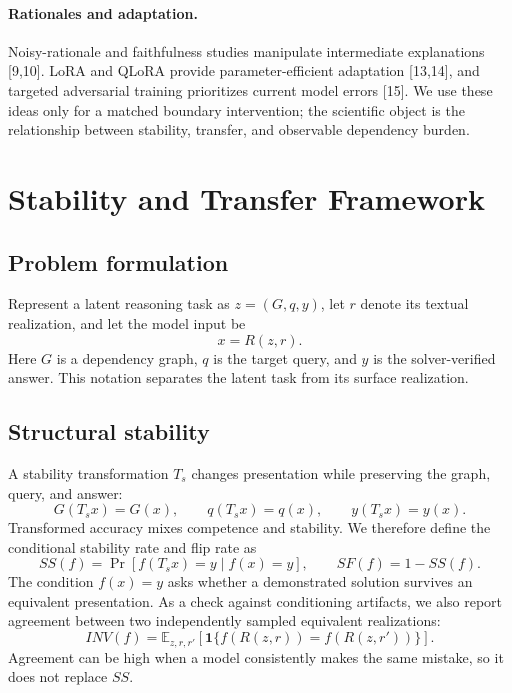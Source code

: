 \documentclass[11pt,a4paper]{article}
\theoremstyle{plain}
\begin{document}
\paragraph{Rationales and adaptation.}
Noisy-rationale and faithfulness studies manipulate intermediate explanations
[9,10]. LoRA and QLoRA provide parameter-efficient adaptation [13,14], and
targeted adversarial training prioritizes current model errors [15]. We use
these ideas only for a matched boundary intervention; the scientific object is
the relationship between stability, transfer, and observable dependency burden.

\section{Stability and Transfer Framework}

\subsection{Problem formulation}

Represent a latent reasoning task as $z=(G,q,y)$, let $r$ denote its textual
realization, and let the model input be
\begin{equation}
x=R(z,r).
\end{equation}
Here $G$ is a dependency graph, $q$ is the target query, and $y$ is the
solver-verified answer. This notation separates the latent task from its
surface realization.

\subsection{Structural stability}

A stability transformation $T_s$ changes presentation while preserving the
graph, query, and answer:
\begin{equation}
G(T_sx)=G(x), \qquad q(T_sx)=q(x), \qquad y(T_sx)=y(x).
\end{equation}
Transformed accuracy mixes competence and stability. We therefore define the
conditional stability rate and flip rate as
\begin{equation}
SS(f)=\Pr[f(T_sx)=y\mid f(x)=y],
\qquad SF(f)=1-SS(f).
\end{equation}
The condition $f(x)=y$ asks whether a demonstrated solution survives an
equivalent presentation.
As a check against conditioning artifacts, we also report agreement between
two independently sampled equivalent realizations:
\begin{equation}
INV(f)=\mathbb E_{z,r,r'}\left[
\mathbf 1\{f(R(z,r))=f(R(z,r'))\}\right].
\end{equation}
Agreement can be high when a model consistently makes the same mistake, so it
does not replace $SS$.
\end{document}
